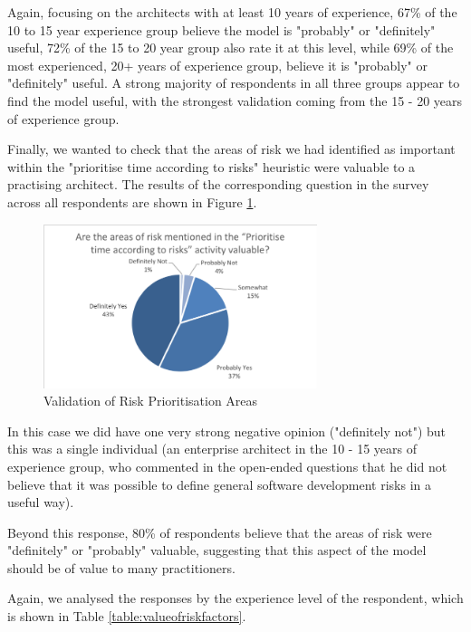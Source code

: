 Again, focusing on the architects with at least 10 years of experience, 67\% of the 10 to 15 year experience group believe the model is "probably" or "definitely" useful, 72\% of the 15 to 20 year group also rate it at this level, while 69\% of the most experienced, 20+ years of experience group, believe it is "probably" or "definitely" useful.  A strong majority of respondents in all three groups appear to find the model useful, with the strongest validation coming from the 15 - 20 years of experience group.

Finally, we wanted to check that the areas of risk we had identified as important within the "prioritise time according to risks" heuristic were valuable to a practising architect.  The results of the corresponding question in the survey across all respondents are shown in Figure \ref{figure:validationofareas}.

\begin{figure}[h]
\centering
\includegraphics[width=8cm,trim={2 2 2 2},clip]{Figures/prioritisation-riskareas}
\caption{Validation of Risk Prioritisation Areas}
\label{figure:validationofareas}
\end{figure}

In this case we did have one very strong negative opinion ("definitely not") but this was a single individual (an enterprise architect in the 10 - 15 years of experience group, who commented in the open-ended questions that he did not believe that it was possible to define general software development risks in a useful way).

Beyond this response, 80\% of respondents believe that the areas of risk were "definitely" or "probably" valuable, suggesting that this aspect of the model should be of value to many practitioners.

Again, we analysed the responses by the experience level of the respondent, which is shown in Table \ref{table:valueofriskfactors}.

